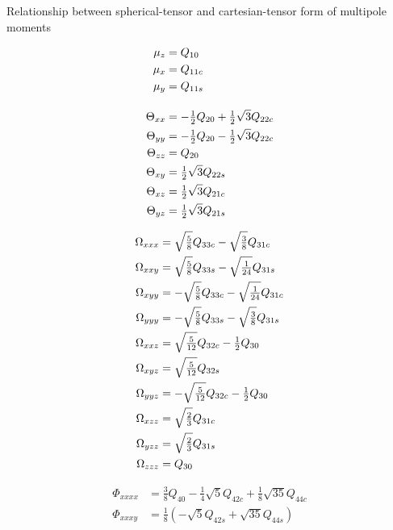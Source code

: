 \documentclass[12pt,txfonts]{paper}
\begin{document}
\begin{table}
\begin{center}
\caption{Relationship between spherical-tensor and cartesian-tensor
form of multipole moments}
\parbox[t]{130pt}{%
\begin{align*}
\mu_z&=Q_{10}\\
\mu_x&=Q_{11c}\\
\mu_y&=Q_{11s}\\[10pt]
\Theta_{xx} &= -\tfrac{1}{2} Q_{20} + \tfrac{1}{2} \sqrt3 Q_{22c}\\
\Theta_{yy} &= -\tfrac{1}{2} Q_{20} - \tfrac{1}{2} \sqrt3 Q_{22c}\\
\Theta_{zz} &= Q_{20}\\
\Theta_{xy} &= \tfrac{1}{2}\sqrt3 Q_{22s}\\
\Theta_{xz} &= \tfrac{1}{2}\sqrt3 Q_{21c}\\
\Theta_{yz} &= \tfrac{1}{2}\sqrt3 Q_{21s}
\end{align*}}
\qquad
\parbox[t]{140pt}{%
\begin{align*}
\Omega_{xxx} &= \sqrt{\tfrac{5}{8}} Q_{33c}-\sqrt{\tfrac{3}{8}} Q_{31c}\\
\Omega_{xxy} &= \sqrt{\tfrac{5}{8}} Q_{33s}-\sqrt{\tfrac{1}{24}} Q_{31s}\\
\Omega_{xyy} &= -\sqrt{\tfrac{5}{8}} Q_{33c}-\sqrt{\tfrac{1}{24}} Q_{31c}\\
\Omega_{yyy} &= -\sqrt{\tfrac{5}{8}} Q_{33s}-\sqrt{\tfrac{3}{8}} Q_{31s}\\
\Omega_{xxz} &= \sqrt{\tfrac{5}{12}} Q_{32c}-\tfrac{1}{2} Q_{30}\\
\Omega_{xyz} &= \sqrt{\tfrac{5}{12}} Q_{32s}\\
\Omega_{yyz} &= -\sqrt{\tfrac{5}{12}} Q_{32c}-\tfrac{1}{2} Q_{30}\\
\Omega_{xzz} &= \sqrt{\tfrac{2}{3}} Q_{31c}\\
\Omega_{yzz} &= \sqrt{\tfrac{2}{3}} Q_{31s}\\
\Omega_{zzz} &= Q_{30}
\end{align*}}
\qquad
\parbox[t]{190pt}{%
\begin{align*}
\Phi_{xxxx} &= {\tfrac{3}{8}} Q_{40} -{\tfrac{1}{4}}\sqrt5 Q_{42c}
          + {\tfrac{1}{8}}\sqrt{35}Q_{44c}\\
\Phi_{xxxy} &= {\tfrac{1}{8}}(-\sqrt{5}Q_{42s}+\sqrt{35}Q_{44s})\\

\end{align*}}
\end{center}
\end{table}
\end{document}
